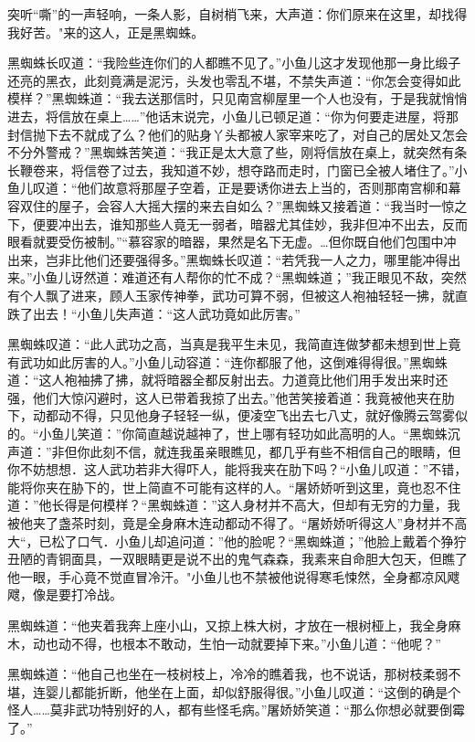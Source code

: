 \documentclass[12pt,oneside]{book}
\begin{document}
突听``嘶''的一声轻响，一条人影，自树梢飞来，大声道：你们原来在这里，却找得我好苦。"来的这人，正是黑蜘蛛。

黑蜘蛛长叹道：``我险些连你们的人都瞧不见了。''小鱼儿这才发现他那一身比缎子还亮的黑衣，此刻竟满是泥污，头发也零乱不堪，不禁失声道：``你怎会变得如此模样？''黑蜘蛛道：``我去送那信时，只见南宫柳屋里一个人也没有，于是我就悄悄进去，将信放在桌上\ldots\ldots{}''他话末说完，小鱼儿已顿足道：``你为何要走进屋，将那封信抛下去不就成了么？他们的贴身丫头都被人家宰来吃了，对自己的居处又怎会不分外警戒？''黑蜘蛛苦笑道：``我正是太大意了些，刚将信放在桌上，就突然有条长鞭卷来，将信卷了过去，我知道不妙，想夺路而走时，门窗已全被人堵住了。''小鱼儿叹道：``他们故意将那屋子空着，正是要诱你进去上当的，否则那南宫柳和幕容双住的屋子，会容人大摇大摆的来去自如么？''黑蜘蛛又接着道：``我当时一惊之下，便要冲出去，谁知那些人竟无一弱者，暗器尤其佳妙，我非但冲不出去，反而眼看就要受伤被制。''``慕容家的暗器，果然是名下无虚。\ldots 但你既自他们包围中冲出来，岂非比他们还要强得多。''黑蜘蛛长叹道：``若凭我一人之力，哪里能冲得出来。''小鱼儿讶然道：难道还有人帮你的忙不成？``黑蜘蛛道；''我正眼见不敌，突然有个人飘了进来，顾人玉家传神拳，武功可算不弱，但被这人袍袖轻轻一拂，就直跌了出去！``小鱼儿失声道：``这人武功竟如此厉害。''

黑蜘蛛叹道：``此人武功之高，当真是我平生未见，我简直连做梦都未想到世上竟有武功如此厉害的人。''小鱼儿动容道：``连你都服了他，这倒难得得很。''黑蜘蛛道：``这人袍袖拂了拂，就将暗器全都反射出去。力道竟比他们用手发出来时还强，他们大惊闪避时，这人已带着我掠了出去。''他苦笑接着道：我竟被他夹在肋下，动都动不得，只见他身子轻轻一纵，便凌空飞出去七八丈，就好像腾云驾雾似的。``小鱼儿笑道：''你简直越说越神了，世上哪有轻功如此高明的人。``黑蜘蛛沉声道：''非但你此刻不信，就连我虽亲眼瞧见，都几乎有些不相信自己的眼睛，但你不妨想想．这人武功若非大得吓人，能将我夹在肋下吗？``小鱼儿叹道：''不错，能将你夹在胁下的，世上简直不可能有这样的人。``屠娇娇听到这里，竟也忍不住道：''他长得是何模样？``黑蜘蛛道：''这人身材并不高大，但却有无穷的力量，我被他夹了盏茶时刻，竟是全身麻木连动都动不得了。``屠娇娇听得这人''身材并不高大``，已松了口气．小鱼儿却追问道：''他的脸呢？``黑蜘蛛道；''他脸上戴着个狰狞丑陋的青铜面具，一双眼睛更是说不出的鬼气森森，我素来自命胆大包天，但瞧了他一眼，手心竟不觉直冒冷汗。"小鱼儿也不禁被他说得寒毛悚然，全身都凉风飕飕，像是要打冷战。

黑蜘蛛道：``他夹着我奔上座小山，又掠上株大树，才放在一根树桠上，我全身麻木，动也动不得，也根本不敢动，生怕一动就要掉下来。''小鱼儿道：``他呢？''

黑蜘蛛道：``他自己也坐在一枝树枝上，冷冷的瞧着我，也不说话，那树枝柔弱不堪，连婴儿都能折断，他坐在上面，却似舒服得很。''小鱼儿叹道：``这倒的确是个怪人\ldots\ldots 莫非武功特别好的人，都有些怪毛病。''屠娇娇笑道：``那么你想必就要倒霉了。''
\end{document}
